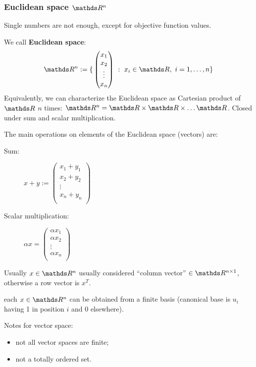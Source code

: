 \documentclass[ComputationalMathematics.tex]{subfiles}
\begin{document}
\subsubsection{Euclidean space $\R^n$}
Single numbers are not enough, except for objective function values.
\begin{definition}
We call \textbf{Euclidean space}:
\[
  \R^n := \{ \, \begin{pmatrix}x_1\\ x_2\\ \vdots\\ x_n\end{pmatrix}~:~x_i \in \R,~i = 1, \ldots, n\}
\]
Equivalently, we can characterize the Euclidean space as Cartesian product of $\R$ $n$ times: $\R^n = \R \times \R \times \ldots \R$. Closed under sum and scalar multiplication.
\end{definition}

The main operations on elements of the Euclidean space (vectors) are:

\begin{description}
  \item[{\sc Sum:}] $x + y := \begin{pmatrix}x_1 + y_1\\
      x_2 + y_2\\
      \vdots\\
      x_n + y_n\\
  \end{pmatrix}$
\item[{\sc Scalar multiplication:}] $\alpha x = \begin{pmatrix}\alpha x_1\\
    \alpha x_2\\
    \vdots\\
    \alpha x_n\\
  \end{pmatrix}$
\end{description}

Usually $x \in \R^n$ usually considered “column vector” $\in \R^{n \times 1}$, otherwise a row vector is  $x^T$.

\begin{definition} each $x \in \R^n$ can be obtained from a finite basis (canonical base is $u_i$ having 1 in position $i$ and 0 elsewhere).
\end{definition}
Notes for vector space:
\begin{itemize}
    \item not all vector spaces are finite;
    \item not a totally ordered set.
\end{itemize}
\end{document}
